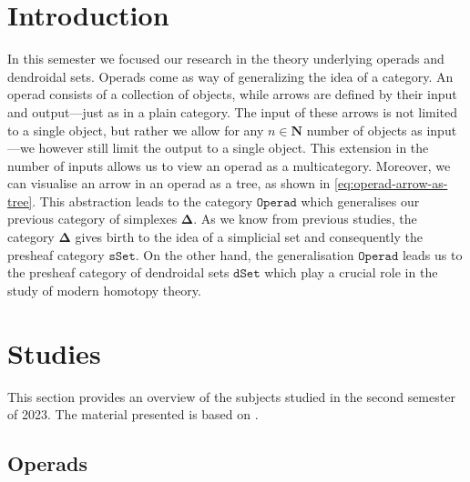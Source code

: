 \documentclass[11pt, reqno]{amsart}
\theoremstyle{definition}
\newcommand{\N}{\mathbf{N}}
\newcommand{\catfont}{\texttt}
\newcommand{\Splx}{{\mathbf{\Delta}}}           %
\newcommand{\sSet}{{\catfont{sSet}}}            %
\newcommand{\Operad}{{\catfont{Operad}}}
\newcommand{\dSet}{{\catfont{dSet}}}
\begin{document}
\section{Introduction}

In this semester we focused our research in the theory underlying operads and dendroidal sets.
Operads come as way of generalizing the idea of a category. An operad consists of a collection of
objects, while arrows are defined by their input and output---just as in a plain category. The input
of these arrows is not limited to a single object, but rather we allow for any \(n \in \N\) number
of objects as input---we however still limit the output to a single object. This extension in the
number of inputs allows us to view an operad as a multicategory. Moreover, we can visualise an arrow
in an operad as a tree, as shown in \cref{eq:operad-arrow-as-tree}. This abstraction leads to the
category \(\Operad\) which generalises our previous category of simplexes \(\Splx\). As we know from
previous studies, the category \(\Splx\) gives birth to the idea of a simplicial set and
consequently the presheaf category \(\sSet\). On the other hand, the generalisation \(\Operad\)
leads us to the presheaf category of dendroidal sets \(\dSet\) which play a crucial role in the
study of modern homotopy theory.

\section{Studies}

This section provides an overview of the subjects studied in the second
semester of 2023. The material presented is based on
\cite{Weiss07,HeuMoer22,MoerdijkWeiss07}.

\subsection{Operads}
\end{document}
